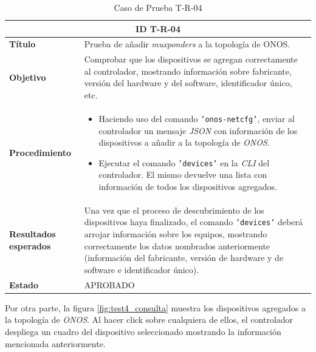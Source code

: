 \begin{table}[H]
  \centering
  \begin{tabular}{ |m{2.5cm}|m{11cm}|  }
  \hline
  \multicolumn{2}{|c|}{ \textbf{ID T-R-04} } \\
  \hline
  \centering
  \textbf{Título} & Prueba de añadir \textit{muxponders} a la topología de ONOS.  \\
  \hline
  \centering
  \textbf{Objetivo} & Comprobar que los dispositivos se agregan correctamente al controlador, mostrando información sobre fabricante, versión del hardware y del software, identificador único, etc.  \\
  \hline
  \centering
  \textbf{Procedimiento} & \begin{itemize}
    \item Haciendo uso del comando \texttt{'onos-netcfg'}, enviar al controlador un mensaje \textit{JSON} con información de los dispositivos a añadir a la topología de \textit{ONOS}.
    \item Ejecutar el comando \texttt{'devices'} en la \textit{CLI} del controlador. El mismo devuelve una lista con información de todos los dispositivos agregados.
  \end{itemize}     \\
  \hline
  \centering
  \textbf{Resultados esperados} & 
  Una vez que el proceso de descubrimiento de los dispositivos haya finalizado, el comando \texttt{'devices'} deberá arrojar información sobre los equipos, mostrando correctamente los datos nombrados anteriormente (información del fabricante, versión de hardware y de software e identificador único).
    \\
  
    \hline
  \centering
    \textbf{Estado}    & APROBADO  \\
  \hline
  \end{tabular}
  
  \caption{Caso de Prueba T-R-04}
  \label{tab:TR04}
  \end{table}

  Por otra parte, la figura \ref{fig:test4_consulta} muestra los dispositivos agregados a la topología de \textit{ONOS}. Al hacer click sobre cualquiera de ellos, el controlador despliega un cuadro del dispositivo seleccionado mostrando la información mencionada anteriormente.

